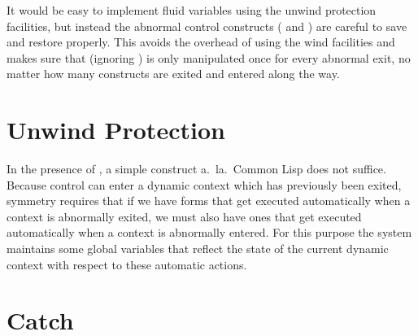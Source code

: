 It would be easy to implement fluid variables using the unwind
protection facilities, but instead the abnormal control constructs
( and ) are careful to save and restore
 properly.  This avoids the overhead of using
the wind facilities and makes sure that (ignoring )
 is only manipulated once for every abnormal
exit, no matter how many  constructs are exited and entered
along the way.




\section{Unwind Protection} \label{sec:oakwind}

In the presence of , a simple 
construct a.\ la.\ Common Lisp does not suffice.  Because control can
enter a dynamic context which has previously been exited, symmetry
requires that if we have forms that get executed automatically when a
context is abnormally exited, we must also have ones that get executed
automatically when a context is abnormally entered.  For this purpose
the system maintains some global variables that reflect the state of
the current dynamic context with respect to these automatic actions.




\section{Catch} \label{sec:oakcatch}

